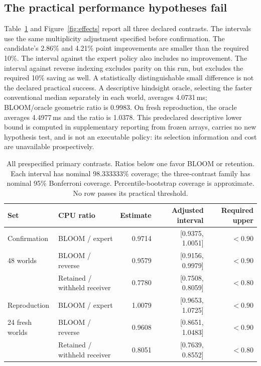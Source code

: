 \documentclass[11pt,letterpaper]{article}
\begin{document}
\subsection{The practical performance hypotheses fail}
Table~\ref{tab:effects} and Figure~\ref{fig:effects} report all three declared contrasts. The intervals use the same multiplicity adjustment specified before confirmation. The candidate's 2.86\% and 4.21\% point improvements are smaller than the required 10\%. The interval against the expert policy also includes no improvement. The interval against reverse indexing excludes parity on this run, but excludes the required 10\% saving as well. A statistically distinguishable small difference is not the declared practical success. A descriptive hindsight oracle, selecting the faster conventional median separately in each world, averages 4.0731\,ms; BLOOM/oracle geometric ratio is 0.9983. On fresh reproduction, the oracle averages 4.4977\,ms and the ratio is 1.0378. This predeclared descriptive lower bound is computed in supplementary reporting from frozen arrays, carries no new hypothesis test, and is not an executable policy: its selection information and cost are unavailable prospectively.

\begin{table}[htbp]
\centering\small
\begin{tabular}{@{}llrrr@{}}
\toprule
Set & CPU ratio & Estimate & Adjusted interval & Required upper \\
\midrule
Confirmation & BLOOM / expert & 0.9714 & [0.9375, 1.0051] & $<0.90$ \\
48 worlds & BLOOM / reverse & 0.9579 & [0.9156, 0.9979] & $<0.90$ \\
 & Retained / withheld receiver & 0.7780 & [0.7508, 0.8059] & $<0.80$ \\
\addlinespace
Reproduction & BLOOM / expert & 1.0079 & [0.9653, 1.0725] & $<0.90$ \\
24 fresh worlds & BLOOM / reverse & 0.9608 & [0.8651, 1.0483] & $<0.90$ \\
 & Retained / withheld receiver & 0.8051 & [0.7639, 0.8552] & $<0.80$ \\
\bottomrule
\end{tabular}
\caption{All prespecified primary contrasts. Ratios below one favor BLOOM or retention. Each interval has nominal 98.333333\% coverage; the three-contrast family has nominal 95\% Bonferroni coverage. Percentile-bootstrap coverage is approximate. No row passes its practical threshold.}
\label{tab:effects}
\end{table}
\end{document}
